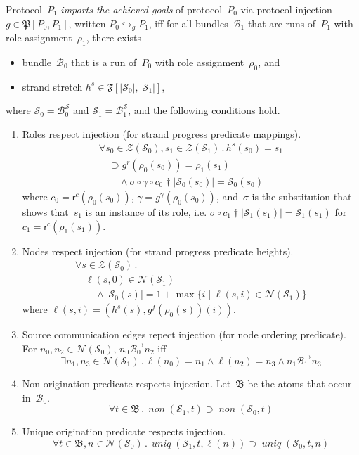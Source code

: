 \documentclass[12pt]{article}
\newcommand{\fn}[1]{\ensuremath{\operatorname{\mathit{#1}}}}
\newcommand{\prefix}[2]{#1\dagger#2}
\newcommand{\all}[1]{\forall#1\mathpunct.}
\newcommand{\some}[1]{\exists#1\mathpunct.}
\newcommand{\alg}[1]{\ensuremath{\mathfrak{#1}}}
\newcommand{\atm}{\alg{B}}
\newcommand{\ssp}{\ensuremath{\mathcal{S}}}
\newcommand{\bun}{\ensuremath{\mathcal{B}}}
\newcommand{\strands}{\ensuremath{\mathcal{Z}}}
\newcommand{\nodes}{\ensuremath{\mathcal{N}}}
\newcommand{\rl}{\ensuremath{\rho}}
\newcommand{\role}{\mathsf{r}}
\begin{document}
Protocol~$P_1$ \emph{imports the achieved goals} of protocol~$P_0$ via
protocol injection $g\in\alg{P}[P_0,P_1]$, written
$P_0\hookrightarrow_g P_1$, iff for all bundles~$\bun_1$ that are runs
of~$P_1$ with role assignment~$\rl_1$, there exists
\begin{itemize}
\item bundle~$\bun_0$ that is a run of~$P_0$ with role
  assignment~$\rl_0$, and
\item strand stretch $h^s\in\alg{F}[|\ssp_0|, |\ssp_1|]$,
\end{itemize}
where $\ssp_0=\bun^\ssp_0$ and $\ssp_1=\bun^\ssp_1$, and the following
conditions hold.
\begin{enumerate}

\item\label{item: role mappings} Roles respect injection (for strand
  progress predicate mappings).
  \[\begin{array}{l}
  \all{s_0\in\strands(\ssp_0),s_1\in\strands(\ssp_1)}h^s(s_0) =
  s_1\\ \quad\supset
  g^r(\rl_0(s_0))=\rl_1(s_1)\\ \qquad{}\land\sigma\circ
  \gamma\circ\prefix{c_0}{|\ssp_0(s_0)|}
  = \ssp_0(s_0)
  \end{array}\]
  where $c_0=\role^c(\rl_0(s_0))$,
  $\gamma=g^\gamma(\rl_0(s_0))$, and~$\sigma$ is the substitution that
  shows that~$s_1$ is an instance of its role, i.e.\@
  $\sigma\circ\prefix{c_1}{|\ssp_1(s_1)|}=\ssp_1(s_1)$ for
  $c_1=\role^c(\rl_1(s_1))$.

\item\label{item: role heights} Nodes respect injection (for strand
  progress predicate heights).
  \[\begin{array}{l}
  \all{s\in\strands(\ssp_0)}\\
  \quad\ell(s,0)\in\nodes(\ssp_1)\\
  \qquad{}\land|\ssp_0(s)|=1+\max
  \{i\mid\ell(s,i)\in\nodes(\ssp_1)\}
  \end{array}\]
  where $\ell(s,i)=(h^s(s),g^f(\rl_0(s))(i))$.

\item\label{item: node orderings} Source communication edges repect
  injection (for node ordering predicate).  For
  $n_0,n_2\in\nodes(\ssp_0)$, $n_0\mathbin{\bun^\to_0} n_2$ iff
  \[\some{n_1,n_3\in\nodes(\ssp_1)}\ell(n_0)=n_1\land\ell(n_2)=n_3\land
  n_1\mathbin{\bun^\to_1} n_3\]

\item\label{item: nons} Non-origination predicate respects injection.
  Let~$\atm$ be the atoms that occur in~$\bun_0$.
  \[\all{t\in\atm}\fn{non}(\ssp_1, t)\supset\fn{non}(\ssp_0, t)\]

\item\label{item: uniques} Unique origination predicate respects injection.
  \[\all{t\in\atm,n\in\nodes(\ssp_0)}\fn{uniq}(\ssp_1,
  t,\ell(n))\supset\fn{uniq}(\ssp_0, t,n)\]
\end{enumerate}
\end{document}
